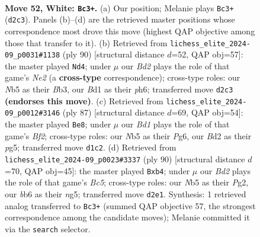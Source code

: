 \documentclass[11pt]{article}
\begin{document}
\clearpage

\begin{figure}[p]\centering
\begin{subfigure}{0.46\textwidth}\centering
\resizebox{\linewidth}{!}{%
\newchessgame
\chessboard[
  setfen={nn6/1p4k1/1b6/pN1p4/6bp/PP2P3/3BP1K1/3B4 w - - 0 52},
  showmover=false,
  pgfstyle=straightmove, color=movearrow, markmove={d2-c3}
]}
\caption{}
\end{subfigure}\hfill
\begin{subfigure}{0.46\textwidth}\centering
\resizebox{\linewidth}{!}{%
\newchessgame
\chessboard[
  setfen={8/4k3/7p/5p1b/5P1p/1BpP1P2/2P1N1K1/4b3 w - - 0 46},
  showmover=false,
  pgfstyle=straightmove, color=movearrow, markmove={e2-d4}
]}
\caption{}
\end{subfigure}
\\[4pt]
\begin{subfigure}{0.46\textwidth}\centering
\resizebox{\linewidth}{!}{%
\newchessgame
\chessboard[
  setfen={8/4kb1p/4p1pP/2p3P1/p1B5/P2P1K2/7r/1R6 b - - 8 44},
  showmover=false,
  pgfstyle=straightmove, color=movearrow, markmove={f7-e8}
]}
\caption{}
\end{subfigure}\hfill
\begin{subfigure}{0.46\textwidth}\centering
\resizebox{\linewidth}{!}{%
\newchessgame
\chessboard[
  setfen={b7/P4k2/2p5/2Bp2n1/1p5p/1B5P/1P4P1/6K1 w - - 2 46},
  showmover=false,
  pgfstyle=straightmove, color=movearrow, markmove={c5-b4}
]}
\caption{}
\end{subfigure}
\caption{\textbf{Move 52, White: \texttt{Bc3+}.} (a) Our position; Melanie plays \texttt{Bc3+} (\texttt{d2c3}). Panels (b)--(d) are the retrieved master positions whose correspondence most drove this move (highest QAP objective among those that transfer to it). (b) Retrieved from \texttt{lichess\_elite\_2024-09\_p0031\#1138} (ply 90) [structural distance $d$=52, QAP obj=57]: the master played \texttt{Nd4}; under $\mu$ our \emph{Bd2} plays the role of that game's \emph{Ne2} (a \textbf{cross-type} correspondence); cross-type roles: our \emph{N}b5 as their \emph{B}b3, our \emph{B}d1 as their \emph{p}h6; transferred move \texttt{d2c3} \textbf{(endorses this move)}. (c) Retrieved from \texttt{lichess\_elite\_2024-09\_p0012\#3146} (ply 87) [structural distance $d$=69, QAP obj=54]: the master played \texttt{Be8}; under $\mu$ our \emph{Bd1} plays the role of that game's \emph{Bf2}; cross-type roles: our \emph{N}b5 as their \emph{P}g6, our \emph{B}d2 as their \emph{p}g5; transferred move \texttt{d1c2}. (d) Retrieved from \texttt{lichess\_elite\_2024-09\_p0023\#3337} (ply 90) [structural distance $d$=70, QAP obj=45]: the master played \texttt{Bxb4}; under $\mu$ our \emph{Bd2} plays the role of that game's \emph{Bc5}; cross-type roles: our \emph{N}b5 as their \emph{P}g2, our \emph{b}b6 as their \emph{n}g5; transferred move \texttt{d2e1}. Synthesis: 1 retrieved analog transferred to \texttt{Bc3+} (summed QAP objective 57, the strongest correspondence among the candidate moves); Melanie committed it via the \texttt{search} selector.}
\label{fig:thought-m102}
\end{figure}
\end{document}
